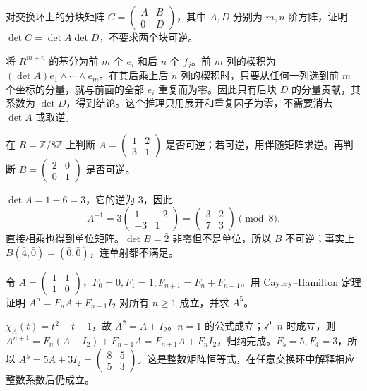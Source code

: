 \begin{exercise}\label{b2:ex:09-block-triangular}
	对交换环上的分块矩阵 \(C=\begin{pmatrix}A&B\\0&D\end{pmatrix}\)，其中 \(A,D\) 分别为 \(m,n\) 阶方阵，证明 \(\det C=\det A\det D\)，不要求两个块可逆。
\end{exercise}
\begin{solution}
	将 \(R^{m+n}\) 的基分为前 \(m\) 个 \(e_i\) 和后 \(n\) 个 \(f_j\)。前 \(m\) 列的楔积为 \((\det A)e_1\wedge\cdots\wedge e_m\)。在其后乘上后 \(n\) 列的楔积时，只要从任何一列选到前 \(m\) 个坐标的分量，就与前面的全部 \(e_i\) 重复而为零。因此只有后块 \(D\) 的分量贡献，其系数为 \(\det D\)，得到结论。这个推理只用展开和重复因子为零，不需要消去 \(\det A\) 或取逆。
\end{solution}

\begin{exercise}\label{b2:ex:09-adjugate-mod-eight}
	在 \(R=\mathbb Z/8\mathbb Z\) 上判断 \(A=\begin{pmatrix}1&2\\3&1\end{pmatrix}\) 是否可逆；若可逆，用伴随矩阵求逆。再判断 \(B=\begin{pmatrix}2&0\\0&1\end{pmatrix}\) 是否可逆。
\end{exercise}
\begin{solution}
	\(\det A=1-6=\bar3\)，它的逆为 \(\bar3\)，因此
	\[
		A^{-1}=3\begin{pmatrix}1&-2\\-3&1\end{pmatrix}
		=\begin{pmatrix}3&2\\7&3\end{pmatrix}\pmod8.
	\]
	直接相乘也得到单位矩阵。\(\det B=\bar2\) 非零但不是单位，所以 \(B\) 不可逆；事实上 \(B(\bar4,\bar0)=(\bar0,\bar0)\)，连单射都不满足。
\end{solution}

\begin{exercise}\label{b2:ex:09-cayley-recurrence}
	令 \(A=\begin{pmatrix}1&1\\1&0\end{pmatrix}\)，\(F_0=0,F_1=1,F_{n+1}=F_n+F_{n-1}\)。用 Cayley–Hamilton 定理证明 \(A^n=F_nA+F_{n-1}I_2\) 对所有 \(n\ge1\) 成立，并求 \(A^5\)。
\end{exercise}
\begin{solution}
	\(\chi_A(t)=t^2-t-1\)，故 \(A^2=A+I_2\)。\(n=1\) 的公式成立；若 \(n\) 时成立，则
	\(A^{n+1}=F_n(A+I_2)+F_{n-1}A=F_{n+1}A+F_nI_2\)，归纳完成。\(F_5=5,F_4=3\)，所以 \(A^5=5A+3I_2=\begin{pmatrix}8&5\\5&3\end{pmatrix}\)。这是整数矩阵恒等式，在任意交换环中解释相应整数系数后仍成立。
\end{solution}

